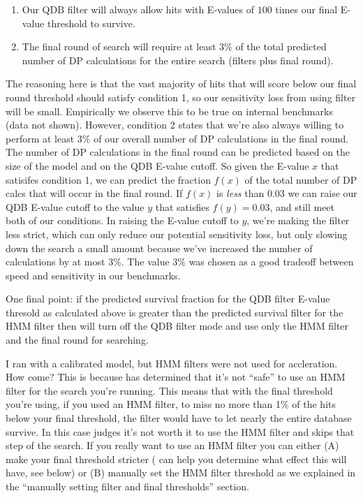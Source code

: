 \begin{enumerate}
\item
Our QDB filter will always allow hits with E-values of $100$ times our
final E-value threshold to survive. 
\item
The final round of search will require at least $3\%$ of the total
predicted number of DP calculations for the entire search (filters
plus final round).
\end{enumerate}

The reasoning here is that the vast majority of hits that will score
below our final round threshold should satisfy condition 1, so
our sensitivity loss from using filter will be small. Empirically we
observe this to be true on internal benchmarks (data not shown).
However, condition 2 states that we're also always willing to perform
at least $3\%$ of our overall number of DP calculations in the final
round. The number of DP calculations in the final round can be
predicted based on the size of the model and on the QDB E-value
cutoff. So given the E-value $x$ that satisifes condition 1, we can
predict the fraction $f(x)$ of the total number of DP calcs that will
occur in the final round. If $f(x)$ is \emph{less} than $0.03$ we can
raise our QDB E-value cutoff to the value $y$ that satisfies $f(y) = 0.03$, and
still meet both of our conditions. In raising the E-value cutoff to
$y$, we're making the filter less strict, which can only reduce our
potential sensitivity loss, but only slowing down the search a small
amount because we've increased the number of calculations by at most
$3\%$.  The value $3\%$ was chosen as a good tradeoff between speed
and sensitivity in our benchmarks. 

One final point: if the predicted survival fraction for the QDB filter
E-value thresold as calculated above is greater than the predicted
survival filter for the HMM filter then  will turn off
the QDB filter mode and use only the HMM filter and the final round
for searching.


\begin{srefaq}{I ran  with a calibrated model, but HMM
    filters were not used for accleration. How come?} This is because
     has determined that it's not ``safe'' to use
    an HMM filter for the search you're running. This means that with
    the final threshold you're using, if you used an HMM filter, 
    to miss no more than 1\% of the hits below your final threshold,
    the filter would have to let nearly the entire database
    survive. In this case  judges it's not worth it to
    use the HMM filter and skips that step of the search. If you
    really want to use an HMM filter you can either (A) make your
    final threshold stricter ( can help you determine 
    what effect this will have, see below) or (B) manually set the HMM
    filter threshold as we explained in the ``manually setting filter
    and final thresholds'' section.
\end{srefaq}

